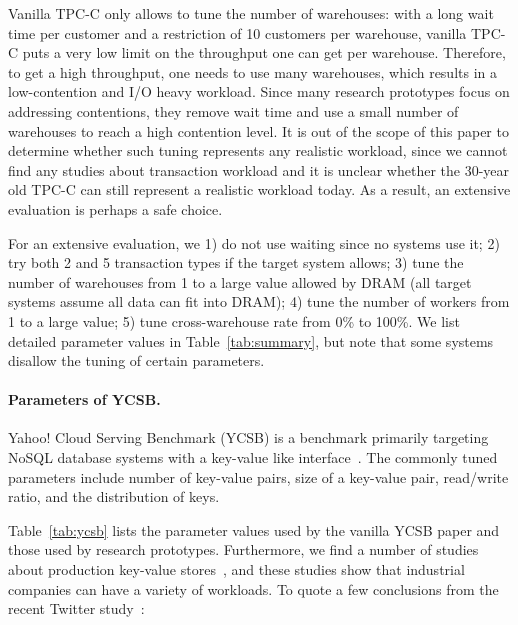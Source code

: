 Vanilla TPC-C only allows to tune the number of warehouses:
with a long wait time per customer and a restriction of 10 customers per warehouse, vanilla
TPC-C puts a very low limit on the throughput one can get per warehouse. Therefore, to get a high
throughput, one needs to use many warehouses, which results in a low-contention and I/O heavy workload.
Since many research prototypes focus on addressing contentions, they remove wait time and use a small number
of warehouses to reach a high contention level.
It is out of the scope of this paper to determine whether such tuning represents any realistic workload,
since we cannot find any studies about transaction workload and it is unclear whether the 30-year old
TPC-C can still represent a realistic workload today. As a result,
an extensive evaluation is perhaps a safe choice.

For an extensive evaluation, we 1) do not use waiting since no systems use it; 2) try both 2 and 5
transaction types if the target system allows; 3) tune the number of warehouses from 1 to a large value
allowed by DRAM (all target systems assume all data can fit into DRAM); 4) tune the number of workers
from 1 to a large value; 5) tune cross-warehouse rate from 0\% to 100\%.
We list detailed parameter values in Table~\ref{tab:summary}, but note that some systems disallow
the tuning of certain parameters.

\vspace{-.1in}
\paragraph{Parameters of YCSB.}

Yahoo! Cloud Serving Benchmark (YCSB) is a benchmark primarily targeting
 NoSQL database systems with a key-value like interface~\cite{Cooper2010YCSB}.
 The commonly tuned parameters include number of key-value pairs, size of a key-value pair,
 read/write ratio, and the distribution of keys.
 
Table~\ref{tab:ycsb} lists the parameter values used by the vanilla YCSB paper
and those used by research prototypes. Furthermore, we find a number of
studies about production key-value stores~\cite{Atikoglu2012WAL,Yang2020Twitter,Nishtala2013Scaling,Berg2020CacheLib},
and these studies show that industrial companies can have a variety of
workloads. To quote a few conclusions from the recent Twitter study~\cite{Yang2020Twitter}:

